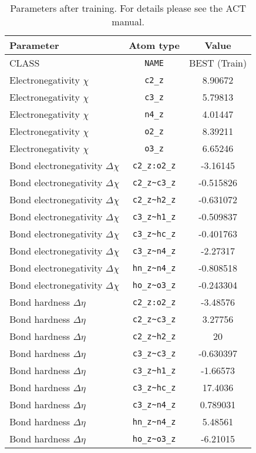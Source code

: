 \begin{table}[ht]
\caption{Parameters after training. For details please see the ACT manual.}
\begin{tabular}{lcc}
\hline
Parameter & Atom type & Value \\ 
\hline
CLASS & \verb^NAME^ & BEST (Train) \\ 
Electronegativity $\chi$ & \verb^c2_z^ & 8.90672 \\ 
Electronegativity $\chi$ & \verb^c3_z^ & 5.79813 \\ 
Electronegativity $\chi$ & \verb^n4_z^ & 4.01447 \\ 
Electronegativity $\chi$ & \verb^o2_z^ & 8.39211 \\ 
Electronegativity $\chi$ & \verb^o3_z^ & 6.65246 \\ 
Bond electronegativity $\Delta\chi$ & \verb^c2_z:o2_z^ & -3.16145 \\ 
Bond electronegativity $\Delta\chi$ & \verb^c2_z~c3_z^ & -0.515826 \\ 
Bond electronegativity $\Delta\chi$ & \verb^c2_z~h2_z^ & -0.631072 \\ 
Bond electronegativity $\Delta\chi$ & \verb^c3_z~h1_z^ & -0.509837 \\ 
Bond electronegativity $\Delta\chi$ & \verb^c3_z~hc_z^ & -0.401763 \\ 
Bond electronegativity $\Delta\chi$ & \verb^c3_z~n4_z^ & -2.27317 \\ 
Bond electronegativity $\Delta\chi$ & \verb^hn_z~n4_z^ & -0.808518 \\ 
Bond electronegativity $\Delta\chi$ & \verb^ho_z~o3_z^ & -0.243304 \\ 
Bond hardness $\Delta\eta$ & \verb^c2_z:o2_z^ & -3.48576 \\ 
Bond hardness $\Delta\eta$ & \verb^c2_z~c3_z^ & 3.27756 \\ 
Bond hardness $\Delta\eta$ & \verb^c2_z~h2_z^ & 20 \\ 
Bond hardness $\Delta\eta$ & \verb^c3_z~c3_z^ & -0.630397 \\ 
Bond hardness $\Delta\eta$ & \verb^c3_z~h1_z^ & -1.66573 \\ 
Bond hardness $\Delta\eta$ & \verb^c3_z~hc_z^ & 17.4036 \\ 
Bond hardness $\Delta\eta$ & \verb^c3_z~n4_z^ & 0.789031 \\ 
Bond hardness $\Delta\eta$ & \verb^hn_z~n4_z^ & 5.48561 \\ 
Bond hardness $\Delta\eta$ & \verb^ho_z~o3_z^ & -6.21015 \\ 

\end{tabular}
\end{table}
